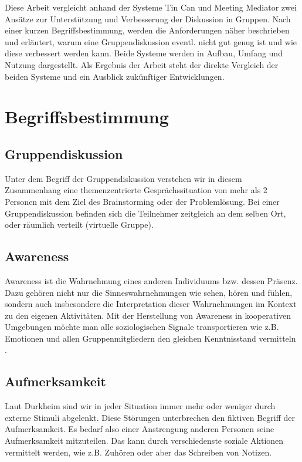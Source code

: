 \documentclass{seminarvorlage}
\begin{document}
Diese Arbeit vergleicht anhand der Systeme Tin Can \cite{HarGorSch2012} und
Meeting Mediator \cite{KimChaHolPent2008} zwei Ansätze zur Unterstützung und
Verbesserung der Diskussion in Gruppen.
Nach einer kurzen Begriffsbestimmung, werden die Anforderungen näher beschrieben
und erläutert, warum eine Gruppendiskussion eventl. nicht gut genug ist und wie
diese verbessert werden kann. Beide Systeme werden in Aufbau, Umfang und Nutzung
dargestellt. Als Ergebnis der Arbeit steht der direkte Vergleich der beiden
Systeme und ein Ausblick zu\-künf\-ti\-ger Entwicklungen.


\section{Begriffsbestimmung}
\subsection{Gruppendiskussion}
Unter dem Begriff der Gruppendiskussion verstehen wir in diesem Zusammenhang
eine themenzentrierte Ge\-sprächs\-situa\-tion von mehr als 2 Personen mit dem
Ziel des Brainstorming oder der Problemlösung. Bei einer Gruppendiskussion befinden
sich die Teilnehmer zeitgleich an dem selben Ort, oder räumlich verteilt
(virtuelle Gruppe).

\subsection{Awareness}
Awareness ist die Wahrnehmung eines anderen Individuums bzw. dessen Präsenz.
Dazu gehören nicht nur die Sinneswahrnehmungen wie sehen, hören und fühlen,
sondern auch insbesondere die Interpretation dieser Wahrnehmungen im Kontext zu
den eigenen Aktivitäten.
Mit der Herstellung von Awareness in kooperativen Umgebungen mö\-chte man alle
soziologischen Signale transportieren wie z.B. Emotionen und allen
Gruppenmitgliedern den gleichen Kenntnisstand vermitteln \cite{SchuLuk2007}.

\subsection{Aufmerksamkeit}
Laut Durkheim \cite{Dur1974} sind wir in jeder Situation immer mehr oder weniger
durch externe Stimuli abgelenkt. Diese Stör\-un\-gen unterbrechen den fiktiven
Begriff der Aufmerksamkeit. Es bedarf also einer Anstrengung anderen Personen
seine Aufmerksamkeit mitzuteilen. Das kann durch verschiedenste soziale Aktionen
vermittelt werden, wie z.B. Zuhören oder aber das Schreiben von Notizen.
\end{document}
